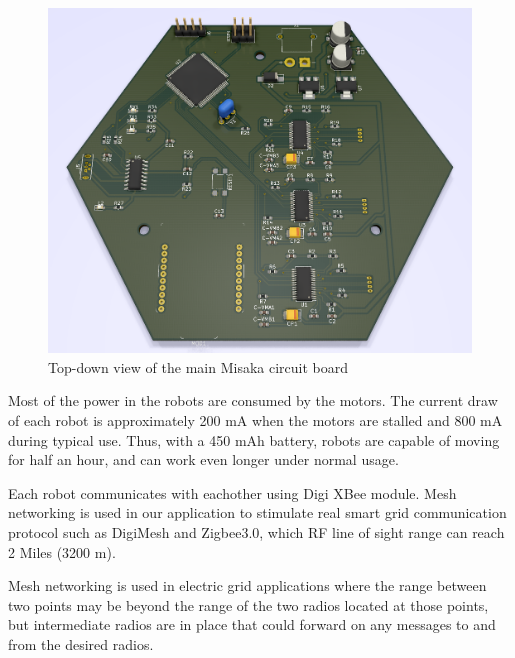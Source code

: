 \documentclass[conference]{IEEEtran}
\begin{document}
\begin{figure}[htbp]
    \centering
    \includegraphics[width=\columnwidth]{PCB.png}
    \caption{Top-down view of the main Misaka circuit board}
    \label{fig:PCB}
\end{figure}

Most of the power in the robots are consumed by the motors. The current draw of each robot is approximately 200 mA when the motors are stalled and 800 mA during typical use. Thus, with a 450 mAh battery, robots are capable of moving for half an hour, and can work even longer under normal usage.

Each robot communicates with eachother using Digi XBee module. Mesh networking is used in our application to stimulate real smart grid communication protocol such as DigiMesh and Zigbee3.0, which RF line of sight range can reach 2 Miles (3200 m).

Mesh networking is used in electric grid applications where the range between two points may be beyond the range of the two radios located at those points, but intermediate radios are in place that could forward on any messages to and from the desired radios.

\end{document}
